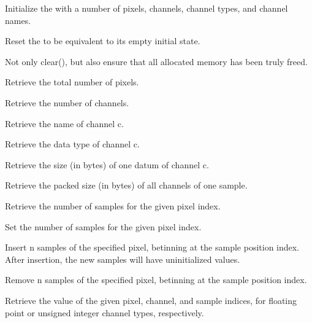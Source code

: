 Initialize the \DeepData with a number of pixels, channels, channel
types, and channel names.
\apiend

Reset the \DeepData to be equivalent to its empty initial state.
\apiend

Not only {\cf clear()}, but also ensure that all allocated memory has been
truly freed.
\apiend

Retrieve the total number of pixels.
\apiend

Retrieve the number of channels.
\apiend

Retrieve the name of channel {\cf c}.
\apiend

Retrieve the data type of channel {\cf c}.
\apiend

Retrieve the size (in bytes) of one datum of channel {\cf c}.
\apiend

Retrieve the packed size (in bytes) of all channels of one sample.
\apiend

Retrieve the number of samples for the given pixel index.
\apiend

Set the number of samples for the given pixel index.
\apiend

Insert {\cf n} samples of the specified pixel, betinning at the sample
position index. After insertion, the new samples will have uninitialized
values.
\apiend

Remove {\cf n} samples of the specified pixel, betinning at the sample
position index.
\apiend

Retrieve the value of the given pixel, channel, and sample indices, for
floating point or unsigned integer channel types, respectively.
\apiend

